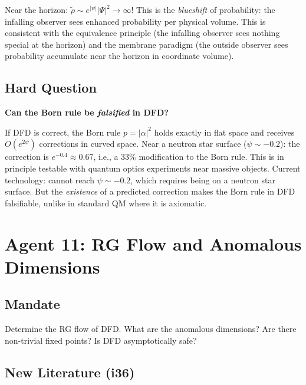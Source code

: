 \documentclass[11pt,a4paper]{article}
\begin{document}
Near the horizon: $\tilde\rho \sim e^{|\psi|}|\Psi|^2 \to \infty$! This is the \emph{blueshift} of probability: the infalling observer sees enhanced probability per physical volume. This is consistent with the equivalence principle (the infalling observer sees nothing special at the horizon) and the membrane paradigm (the outside observer sees probability accumulate near the horizon in coordinate volume).

\subsection{Hard Question}

\textbf{Can the Born rule be \emph{falsified} in DFD?}

If DFD is correct, the Born rule $p = |\alpha|^2$ holds exactly in flat space and receives $O(e^{2\psi})$ corrections in curved space. Near a neutron star surface ($\psi \sim -0.2$): the correction is $e^{-0.4} \approx 0.67$, i.e., a $33\%$ modification to the Born rule. This is in principle testable with quantum optics experiments near massive objects. Current technology: cannot reach $\psi \sim -0.2$, which requires being on a neutron star surface. But the \emph{existence} of a predicted correction makes the Born rule in DFD falsifiable, unlike in standard QM where it is axiomatic.

\newpage
\section{Agent 11: RG Flow and Anomalous Dimensions}
\label{sec:agent11}

\subsection{Mandate}

Determine the RG flow of DFD. What are the anomalous dimensions? Are there non-trivial fixed points? Is DFD asymptotically safe?

\subsection{New Literature (i36)}
\end{document}
